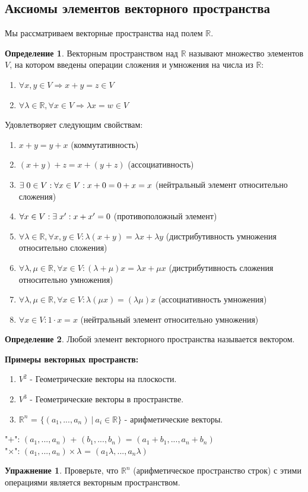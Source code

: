 \documentclass[a4paper, 12pt]{article}
\newcommand{\R}{\mathbb R}
\newcommand\tab[1][.5cm]{\hspace*{#1}}
\theoremstyle{definition}
\newtheorem*{definition}{Определение}
\newtheorem*{Exercise}{Упражнение}
\begin{document}
  \subsection{Аксиомы элементов векторного пространства}
  Мы рассматриваем векторные пространства над полем $\R$.
  \begin{definition}
    Векторным пространством над $\R$ называют множество элементов $V$, на котором введены операции сложения и умножения на числа из $\R$:
    \begin{enumerate}
      \item $ \forall x,y \in V \Longrightarrow x+y=z \in V$
      \item $\forall \lambda \in \R, \forall x \in V \Longrightarrow \lambda x = w \in V$ 
    \end{enumerate}
    Удовлетворяет следующим свойствам:
    \begin{enumerate}
      \item $x+y = y+x$ (коммутативность)
      \item $(x+y)+z = x+(y+z)$ (ассоциативность)
      \item $\exists \tab[0.1cm] 0 \in V: \forall x \in V: x+0 = 0+x = x$ (нейтральный элемент относительно сложения)
      \item $\forall x \in V: \exists \tab[0.1cm] x^{\prime}: x + x^{\prime} = 0$ (противоположный элемент)
      \item $\forall \lambda \in \R, \forall x,y \in V: \lambda (x+y) = \lambda x + \lambda y$ (дистрибутивность умножения относительно сложения)
      \item $\forall \lambda, \mu \in \R, \forall x \in V: (\lambda+\mu)x = \lambda x + \mu x $ (дистрибутивность сложения относительно умножения)
      \item $\forall \lambda, \mu \in \R, \forall x \in V: \lambda(\mu x) = (\lambda \mu) x $ (ассоциативность умножения)
      \item $\forall x \in V: 1 \cdot x = x$ (нейтральный элемент относительно умножения)
    \end{enumerate}
  \end{definition} 

  \begin{definition}
    Любой элемент векторного пространства называется вектором.
  \end{definition} 

  \textbf{Примеры векторных пространств:} 
    \begin{enumerate} 
      \item $V^2$ - Геометрические векторы на плоскости.
      \item $V^3$ - Геометрические векторы в пространстве.
      \item $\R^n$ = $\{ {(a_1,...,a_n) \ | \ a_i \in \R} \}$ - арифметические векторы.
    \end{enumerate}
    \tab[0.8cm]"$+$": $(a_1,...,a_n)$ + $(b_1,...,b_n)$ = $(a_1+b_1,...,a_n+b_n)$ \\
    \tab[0.8cm]"$\times$": $(a_1,...,a_n) \times \lambda$ = $(a_1\lambda,...,a_n\lambda)$ 
  \begin{Exercise}
    Проверьте, что $\R^n$ (арифметическое пространство строк) с этими операциями является векторным пространством. 
  \end{Exercise}  
\end{document}
